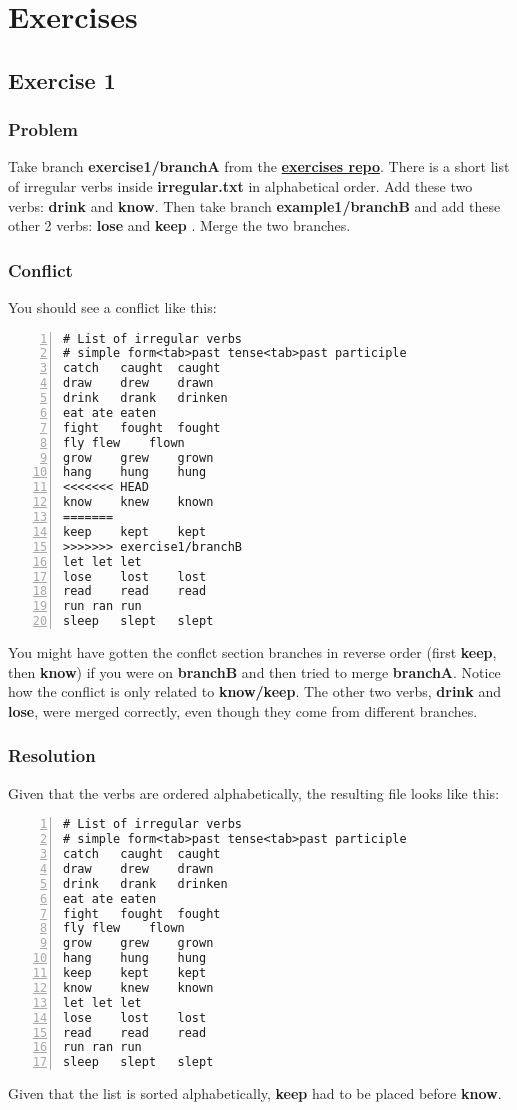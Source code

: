 
\chapter{Exercises}

\section{Exercise 1}
\label{exercise_01}
\subsection*{Problem}
Take branch {\bf exercise1/branchA } from the \hyperref[exercises_repo]{\bf exercises repo}. There is a short list of
irregular verbs inside {\bf irregular.txt} in alphabetical order. Add these two verbs: {\bf drink} and {\bf know}. Then
take branch {\bf example1/branchB } and add these other 2 verbs: {\bf lose } and {\bf keep }. Merge the two branches.

\subsection*{Conflict}
You should see a conflict like this:
\begin{lstlisting}[style=console_style, numbers=left, caption={\bf Exercise 1} - conflict]
# List of irregular verbs
# simple form<tab>past tense<tab>past participle
catch	caught	caught
draw	drew	drawn
drink	drank	drinken
eat	ate	eaten
fight	fought	fought
fly	flew	flown
grow	grew	grown
hang	hung	hung
<<<<<<< HEAD
know	knew	known
=======
keep	kept	kept
>>>>>>> exercise1/branchB
let	let	let
lose	lost	lost
read	read	read
run	ran	run
sleep	slept	slept
\end{lstlisting}

You might have gotten the conflct section branches in reverse order (first {\bf keep}, then {\bf know}) if you were on {\bf branchB} 
and then tried to merge {\bf branchA}. Notice how the conflict is only related to {\bf know/keep}. The other two verbs,
{\bf drink} and {\bf lose}, were merged correctly, even though they come from different branches.

\subsection*{Resolution}
Given that the verbs are ordered alphabetically, the resulting file looks like this:
\begin{lstlisting}[style=console_style, numbers=left, caption={\bf Exercise 1} - Resolution]
# List of irregular verbs
# simple form<tab>past tense<tab>past participle
catch	caught	caught
draw	drew	drawn
drink	drank	drinken
eat	ate	eaten
fight	fought	fought
fly	flew	flown
grow	grew	grown
hang	hung	hung
keep	kept	kept
know	knew	known
let	let	let
lose	lost	lost
read	read	read
run	ran	run
sleep	slept	slept
\end{lstlisting}
Given that the list is sorted alphabetically, {\bf keep} had to be placed before {\bf know}.


